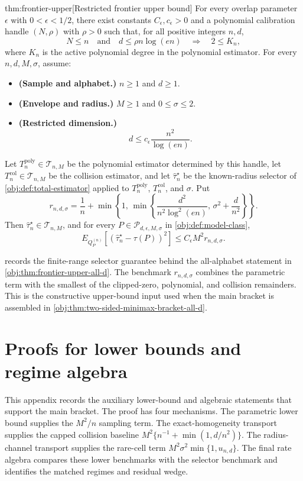 \documentclass[11pt]{article}
\begin{document}
\begin{theoremv}{thm:frontier-upper}[Restricted frontier upper bound]
For every overlap parameter \(\epsilon\) with \(0<\epsilon<1/2\), there exist constants \(C_{\epsilon},c_{\epsilon}>0\) and a polynomial calibration handle \((N,\rho)\) with \(\rho>0\) such that, for all positive integers \(n,d\),
\[
N\le n
\quad\text{and}\quad
d\le \rho n\log(en)
\quad\Longrightarrow\quad
2\le K_n ,
\]
where \(K_n\) is the active polynomial degree in the polynomial estimator.  For every \(n,d,M,\sigma\), assume:
\begin{itemize}
\item \textbf{(Sample and alphabet.)} \(n\ge1\) and \(d\ge1\).
\item \textbf{(Envelope and radius.)} \(M\ge1\) and \(0\le\sigma\le2\).
\item \textbf{(Restricted dimension.)}
\[
d\le c_{\epsilon}\frac{n^2}{\log(en)} .
\]
\end{itemize}
Let \(T_n^{\mathrm{poly}}\in\mathcal T_{n,M}\) be the polynomial estimator determined by this handle, let \(T_n^{\mathrm{col}}\in\mathcal T_{n,M}\) be the collision estimator, and let \(\widehat\tau_n^{\star}\) be the known-radius selector of \cref{obj:def:total-estimator} applied to \(T_n^{\mathrm{poly}}\), \(T_n^{\mathrm{col}}\), and \(\sigma\).  Put
\[
r_{n,d,\sigma}
=
\frac1n+
\min\left\{
1,\,
\min\left\{
\frac{d^2}{n^2\log^2(en)},\,
\sigma^2+\frac{d}{n^2}
\right\}
\right\}.
\]
Then \(\widehat\tau_n^{\star}\in\mathcal T_{n,M}\), and for every \(P\in\mathcal P_{d,\epsilon,M,\sigma}\) in \cref{obj:def:model-class},
\[
E_{Q_P^{(n)}}\!\left[
\left(\widehat\tau_n^{\star}-\tau(P)\right)^2
\right]
\le
C_{\epsilon}M^2 r_{n,d,\sigma}.
\]
\end{theoremv}

 records the finite-range selector guarantee behind the all-alphabet statement in \cref{obj:thm:frontier-upper-all-d}. The benchmark \(r_{n,d,\sigma}\) combines the parametric term with the smallest of the clipped-zero, polynomial, and collision remainders. This is the constructive upper-bound input used when the main bracket is assembled in \cref{obj:thm:two-sided-minimax-bracket-all-d}.


\section{Proofs for lower bounds and regime algebra}

This appendix records the auxiliary lower-bound and algebraic statements that support the main bracket. The proof has four mechanisms. The parametric lower bound supplies the \(M^2/n\) sampling term. The exact-homogeneity transport supplies the capped collision baseline \(M^2\{n^{-1}+\min(1,d/n^2)\}\). The radius-channel transport supplies the rare-cell term \(M^2\sigma^2\min\{1,u_{n,d}\}\). The final rate algebra compares these lower benchmarks with the selector benchmark and identifies the matched regimes and residual wedge.
\end{document}
